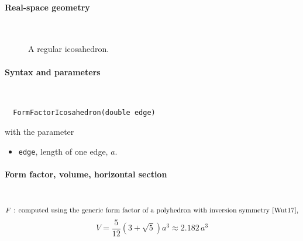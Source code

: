  \label{SIcosahedron}

\paragraph{Real-space geometry}\strut\\

\begin{figure}[H]
\strut\hfill
{}
\hfill\strut
\caption{A regular icosahedron.}
\end{figure}

\FloatBarrier

\paragraph{Syntax and parameters}\strut\\[-2ex plus .2ex minus .2ex]
\begin{lstlisting}
  FormFactorIcosahedron(double edge)
\end{lstlisting}
with the parameter
\begin{itemize}
\item \texttt{edge}, length of one edge, $a$.
\end{itemize}

\paragraph{Form factor, volume, horizontal section}\strut\\
\begin{equation*}
  F \text{~: computed using the generic form factor of a polyhedron
             with inversion symmetry~\cite{Wut17},}
\end{equation*}
\begin{equation*}
  V= \frac{5}{12} (3+\sqrt5)a^3 \approx 2.182\,a^3
\end{equation*}

